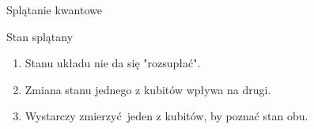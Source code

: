 \documentclass{beamer}
\begin{document}
	\begin{frame}{Splątanie kwantowe}
		
		\begin{block}{Stan splątany$  $}
			\vspace{0.5em}
			\begin{enumerate}
			\item Stanu układu nie da się "rozsupłać".
			\item Zmiana stanu jednego z kubitów wpływa na drugi.
			\item Wystarczy zmierzyć jeden z kubitów, by poznać stan obu.
			\end{enumerate}
			\vspace{0.5em}
		\end{block}	
	\end{frame}
\end{document}
